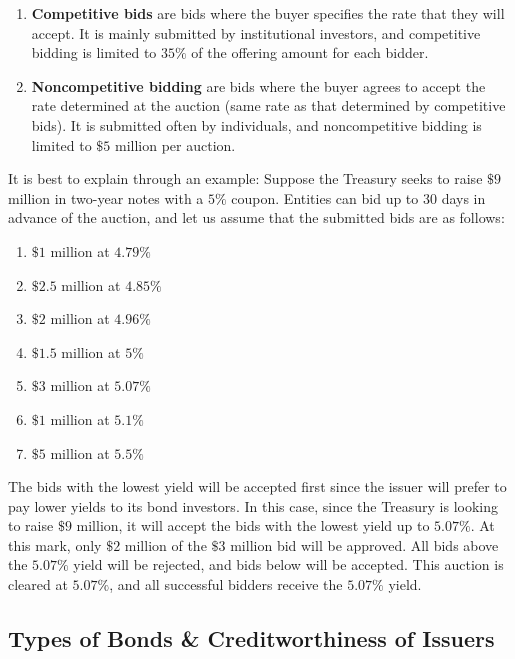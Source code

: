 \documentclass{article}
\begin{document}
    \begin{enumerate}
      \item \textbf{Competitive bids} are bids where the buyer specifies the rate that they will accept. It is mainly submitted by institutional investors, and competitive bidding is limited to $35\%$ of the offering amount for each bidder.
      \item \textbf{Noncompetitive bidding} are bids where the buyer agrees to accept the rate determined at the auction (same rate as that determined by competitive bids). It is submitted often by individuals, and noncompetitive bidding is limited to $\$5$ million per auction.
    \end{enumerate}

    It is best to explain through an example: Suppose the Treasury seeks to raise $\$9$ million in two-year notes with a $5\%$ coupon. Entities can bid up to 30 days in advance of the auction, and let us assume that the submitted bids are as follows:

    \begin{enumerate}
      \item $\$1$ million at $4.79\%$
      \item $\$2.5$ million at $4.85\%$
      \item $\$2$ million at $4.96\%$
      \item $\$1.5$ million at $5\%$
      \item $\$3$ million at $5.07\%$
      \item $\$1$ million at $5.1\%$
      \item $\$5$ million at $5.5\%$
    \end{enumerate}
    The bids with the lowest yield will be accepted first since the issuer will prefer to pay lower yields to its bond investors. In this case, since the Treasury is looking to raise $\$9$ million, it will accept the bids with the lowest yield up to $5.07\%$. At this mark, only $\$2$ million of the $\$3$ million bid will be approved. All bids above the $5.07\%$ yield will be rejected, and bids below will be accepted. This auction is cleared at $5.07\%$, and all successful bidders receive the $5.07\%$ yield.

  \subsection{Types of Bonds \& Creditworthiness of Issuers}
\end{document}
